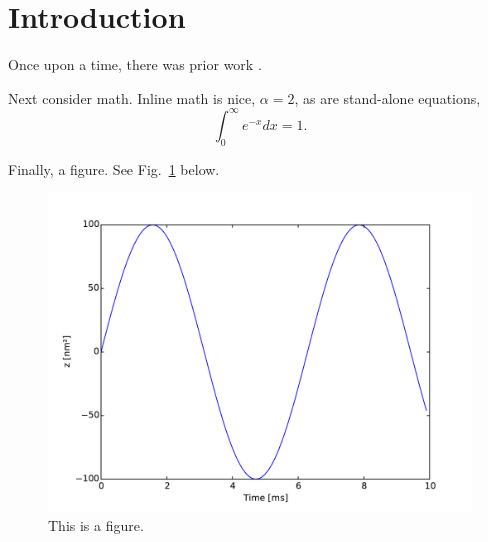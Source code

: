 \documentclass{article}
\begin{document}
\section*{Introduction}

\noindent Once upon a time, there was prior work \cite{Ernst1987,Kuehn2008feb}. 

Next consider math.  Inline math is nice, $\alpha = 2$, as are stand-alone equations,
\begin{equation}
\int_0^{\infty} e^{-x} dx = 1.
\end{equation}

Finally, a figure.  See Fig.~\ref{fig:sine} below.




\newpage

\begin{figure}
\centering
\includegraphics[width=6.50in]{figs/ex.pdf}
\caption{This is a figure.}
\label{fig:sine}
\end{figure}
\end{document}
